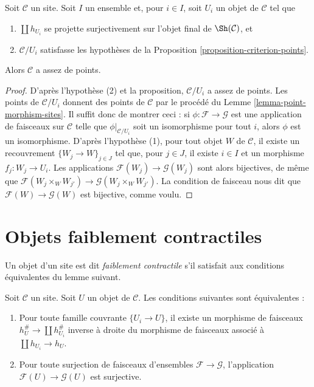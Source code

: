 \begin{lemma}
\label{lemma-criterion-points}
Soit $\mathcal{C}$ un site. Soit $I$ un ensemble et, pour
$i \in I$, soit $U_i$ un objet de $\mathcal{C}$ tel que
\begin{enumerate}
\item $\coprod h_{U_i}$ se projette surjectivement sur
l’objet final de $\Sh(\mathcal{C})$, et
\item $\mathcal{C}/U_i$ satisfasse les hypothèses de la
Proposition \ref{proposition-criterion-points}.
\end{enumerate}
Alors $\mathcal{C}$ a assez de points.
\end{lemma}

\begin{proof}
D’après l’hypothèse (2) et la proposition, $\mathcal{C}/U_i$ a assez de points.
Les points de $\mathcal{C}/U_i$ donnent des points de $\mathcal{C}$
par le procédé du Lemme \ref{lemma-point-morphism-sites}.
Il suffit donc de montrer ceci : si $\phi : \mathcal{F} \to \mathcal{G}$
est une application de faisceaux sur $\mathcal{C}$ telle que $\phi|_{\mathcal{C}/U_i}$
soit un isomorphisme pour tout $i$, alors $\phi$ est un isomorphisme.
D’après l’hypothèse (1), pour tout objet $W$ de $\mathcal{C}$,
il existe un recouvrement $\{W_j \to W\}_{j \in J}$
tel que, pour $j \in J$, il existe $i \in I$ et un morphisme
$f_j : W_j \to U_i$. Les applications
$\mathcal{F}(W_j) \to \mathcal{G}(W_j)$
sont alors bijectives, de même que
$\mathcal{F}(W_j \times_W W_{j'}) \to \mathcal{G}(W_j \times_W W_{j'})$.
La condition de faisceau nous dit que $\mathcal{F}(W) \to \mathcal{G}(W)$
est bijective, comme voulu.
\end{proof}




\section{Objets faiblement contractiles}
\label{section-w-contractible}

\noindent
Un objet d’un site est dit {\it faiblement contractile} s’il satisfait
aux conditions équivalentes du lemme suivant.

\begin{lemma}
\label{lemma-w-contractible}
Soit $\mathcal{C}$ un site. Soit $U$ un objet de $\mathcal{C}$.
Les conditions suivantes sont équivalentes :
\begin{enumerate}
\item Pour toute famille couvrante $\{U_i \to U\}$, il existe un morphisme de
faisceaux $h_U^\# \to \coprod h_{U_i}^\#$ inverse à droite du morphisme de
faisceaux associé à $\coprod h_{U_i} \to h_U$.
\item Pour toute surjection de faisceaux d’ensembles $\mathcal{F} \to \mathcal{G}$,
l’application $\mathcal{F}(U) \to \mathcal{G}(U)$ est surjective.
\end{enumerate}
\end{lemma}

